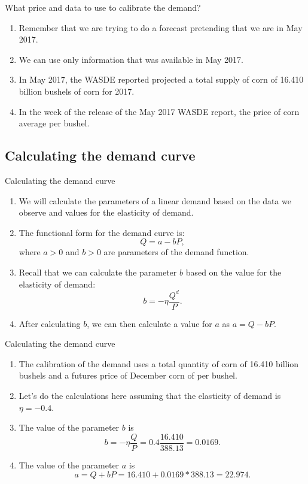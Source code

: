 \documentclass[table,xcolor=pdftex,dvipsnames, handout]{beamer}\usepackage[]{graphicx}\usepackage[]{color}
\begin{document}
\begin{frame}{What price and data to use to calibrate the demand?}
\begin{enumerate}[label=\textbullet]
  \item Remember that we are trying to do a forecast pretending that we are in May 2017.
  \item We can use only information that was available in May 2017.
  \item In May 2017, the WASDE reported projected a total supply of corn of 16.410 billion bushels of corn for 2017.
  \item In the week of the release of the May 2017 WASDE report, the price of corn average  per bushel.
\end{enumerate}
\end{frame}

\subsection{Calculating the demand curve}

\begin{frame}{Calculating the demand curve}
\begin{enumerate}[label=\textbullet]
  \item We will calculate the parameters of a linear demand based on the data we observe and values for the elasticity of demand.
  \item The functional form for the demand curve is:\[ Q = a - b P, \] where $a>0$ and $b>0$ are parameters of the demand function.
  \item Recall that we can calculate the parameter $b$ based on the value for the elasticity of demand: \[b = -\eta \frac{Q^d}{P}.\]
  \vspace{-\baselineskip}
  \item After calculating $b$, we can then calculate a value for $a$ as $a = Q - b P$.
\end{enumerate}
\end{frame}


\begin{frame}{Calculating the demand curve}
\begin{enumerate}[label=\textbullet]
  \item The calibration of the demand uses a total quantity of corn of 16.410 billion bushels and a futures price of December corn of  per bushel.
  \item Let's do the calculations here assuming that the elasticity of demand is $\eta=-0.4$.
  \item The value of the parameter $b$ is \[b = -\eta \frac{Q}{P} = 0.4 \frac{16.410}{388.13} = 0.0169.\]
  \vspace{-\baselineskip}
  \item The value of the parameter $a$ is \[a = Q + b P = 16.410 + 0.0169*388.13 = 22.974.\]
\end{enumerate}
\end{frame}
\end{document}
